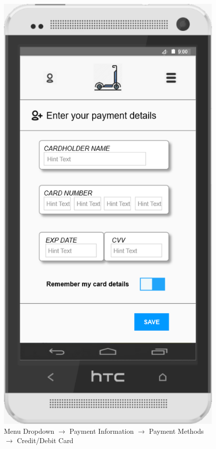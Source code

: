 \documentclass[a4paper, 12pt]{article}
\begin{document}
\begin{figure} [htbp]
  \begin{center}
    \includegraphics[scale=0.75]{images/prototypes/02-02-01-01-menu-dropdown--payment-information--payment-methods--credit-debit-card-info.png}
  \end{center}
  \caption{Menu Dropdown $\rightarrow$ Payment Information $\rightarrow$ Payment Methods $\rightarrow$ Credit/Debit Card}
\end{figure}
\end{document}
